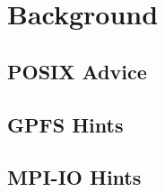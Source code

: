 \section{Background}
\label{sec: background}

\subsection{POSIX Advice}
\label{subsec: posixadvice}

\subsection{GPFS Hints}
\label{subsec: gpfshints}

\subsection{MPI-IO Hints}
\label{subsec: mpiiohints}
